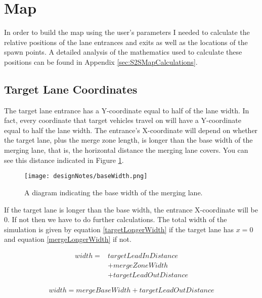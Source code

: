 \section{Map}
\label{sec:Map}
In order to build the map using the user's parameters I needed to calculate the relative positions of the lane entrances and exits as well as the locations of the spawn points. A detailed analysis of the mathematics used to calculate these positions can be found in Appendix \ref{sec:S2SMapCalculations}.

\subsection{Target Lane Coordinates}
\label{subsec:Target Lane Coordinates}
The target lane entrance has a Y-coordinate equal to half of the lane width. In fact, every coordinate that target vehicles travel on will have a Y-coordinate equal to half the lane width. The entrance's X-coordinate will depend on whether the target lane, plus the merge zone length, is longer than the base width of the merging lane, that is, the horizontal distance the merging lane covers. You can see this distance indicated in Figure \ref{fig:baseWidth}.

\begin{figure}[htb]
\centering
\texttt{[image: designNotes/baseWidth.png]}
\caption{A diagram indicating the base width of the merging lane.}
\label{fig:baseWidth}
\end{figure}

If the target lane is longer than the base width, the entrance X-coordinate will be $0$. If not then we have to do further calculations. The total width of the simulation is given by equation \ref{targetLongerWidth} if the target lane has $x=0$ and equation \ref{mergeLongerWidth} if not.

\begin{equation} \label{targetLongerWidth}
	\begin{split}
		width = & targetLeadInDistance \\
			    & + mergeZoneWidth \\
			    & +	targetLeadOutDistance
	\end{split}
\end{equation}

\begin{equation} \label{mergeLongerWidth}
width = mergeBaseWidth + targetLeadOutDistance
\end{equation}

